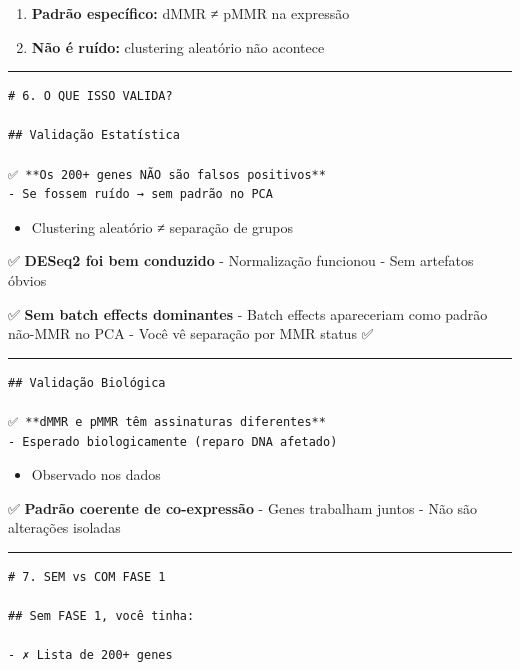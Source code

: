 \documentclass[
]{article}
\providecommand{\tightlist}{%
  \setlength{\itemsep}{0pt}\setlength{\parskip}{0pt}}
\begin{document}
\begin{enumerate}
\def\labelenumi{\arabic{enumi}.}
\setcounter{enumi}{1}
\tightlist
\item
  \textbf{Padrão específico:} dMMR ≠ pMMR na expressão
\item
  \textbf{Não é ruído:} clustering aleatório não acontece
\end{enumerate}

\begin{center}\rule{0.5\linewidth}{0.5pt}\end{center}

\begin{verbatim}
# 6. O QUE ISSO VALIDA?

## Validação Estatística

✅ **Os 200+ genes NÃO são falsos positivos**
- Se fossem ruído → sem padrão no PCA
\end{verbatim}

\begin{itemize}
\tightlist
\item
  Clustering aleatório ≠ separação de grupos
\end{itemize}

✅ \textbf{DESeq2 foi bem conduzido} - Normalização funcionou - Sem
artefatos óbvios

✅ \textbf{Sem batch effects dominantes} - Batch effects apareceriam
como padrão não-MMR no PCA - Você vê separação por MMR status ✅

\begin{center}\rule{0.5\linewidth}{0.5pt}\end{center}

\begin{verbatim}
## Validação Biológica

✅ **dMMR e pMMR têm assinaturas diferentes**
- Esperado biologicamente (reparo DNA afetado)
\end{verbatim}

\begin{itemize}
\tightlist
\item
  Observado nos dados
\end{itemize}

✅ \textbf{Padrão coerente de co-expressão} - Genes trabalham juntos -
Não são alterações isoladas

\begin{center}\rule{0.5\linewidth}{0.5pt}\end{center}

\begin{verbatim}
# 7. SEM vs COM FASE 1

## Sem FASE 1, você tinha:

- ✗ Lista de 200+ genes
\end{verbatim}
\end{document}

